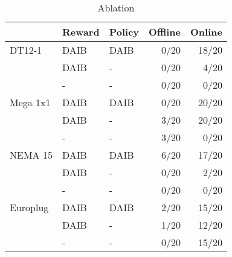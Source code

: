 
\renewcommand{\arraystretch}{1.4}
\setlength{\arrayrulewidth}{0.1mm}
\setlength{\tabcolsep}{3pt}

\begin{table}[]
\begin{tabular}{l|ll|rr}
         & Reward & Policy & \multicolumn{1}{l}{Offline} & \multicolumn{1}{l}{Online} \\ \hline \hline
DT12-1   & DAIB   & DAIB   & 0/20                           & 18/20                         \\
         & DAIB   & -      & 0/20                           & 4/20                          \\
         & -      & -      & 0/20                           & 0/20                          \\  \hline
Mega 1x1 & DAIB   & DAIB   & 0/20                           & 20/20                         \\
         & DAIB   & -      & 3/20                           & 20/20                         \\
         & -      & -      & 3/20                           & 0/20                          \\  \hline
NEMA 15  & DAIB   & DAIB   & 6/20                           & 17/20                         \\
         & DAIB   & -      & 0/20                           & 2/20                          \\
         & -      & -      & 0/20                           & 0/20                          \\  \hline
Europlug & DAIB   & DAIB   & 2/20                           & 15/20                         \\
         & DAIB   & -      & 1/20                           & 12/20                         \\
         & -      & -      & 0/20                           & 15/20                        
\end{tabular}
\caption{Ablation}
\end{table}
